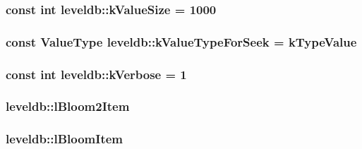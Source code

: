 \subsubsection[{k\+Value\+Size}]{\setlength{\rightskip}{0pt plus 5cm}const int leveldb\+::k\+Value\+Size = 1000\hspace{0.3cm}{\ttfamily [static]}}\label{namespaceleveldb_a193cc831a2200dd1c5e6aee70d6654d3}
\hypertarget{namespaceleveldb_a0b7840e7de67fb0f7905955c02f75cfa}{}
\subsubsection[{k\+Value\+Type\+For\+Seek}]{\setlength{\rightskip}{0pt plus 5cm}const {\bf Value\+Type} leveldb\+::k\+Value\+Type\+For\+Seek = {\bf k\+Type\+Value}\hspace{0.3cm}{\ttfamily [static]}}\label{namespaceleveldb_a0b7840e7de67fb0f7905955c02f75cfa}
\hypertarget{namespaceleveldb_af8897be0086c2db6e31344b7679c170a}{}
\subsubsection[{k\+Verbose}]{\setlength{\rightskip}{0pt plus 5cm}const int leveldb\+::k\+Verbose = 1\hspace{0.3cm}{\ttfamily [static]}}\label{namespaceleveldb_af8897be0086c2db6e31344b7679c170a}
\hypertarget{namespaceleveldb_ae4321eb319595833c9930272feb5dde6}{}
\subsubsection[{l\+Bloom2\+Item}]{ leveldb\+::l\+Bloom2\+Item\hspace{0.3cm}{\ttfamily [static]}}\label{namespaceleveldb_ae4321eb319595833c9930272feb5dde6}
\hypertarget{namespaceleveldb_acc1fed1017077f7029ec84822fa65036}{}
\subsubsection[{l\+Bloom\+Item}]{ leveldb\+::l\+Bloom\+Item\hspace{0.3cm}{\ttfamily [static]}}\label{namespaceleveldb_acc1fed1017077f7029ec84822fa65036}
\hypertarget{namespaceleveldb_a2ce1588463776c9e070e7aeb2dc16dea}{}

